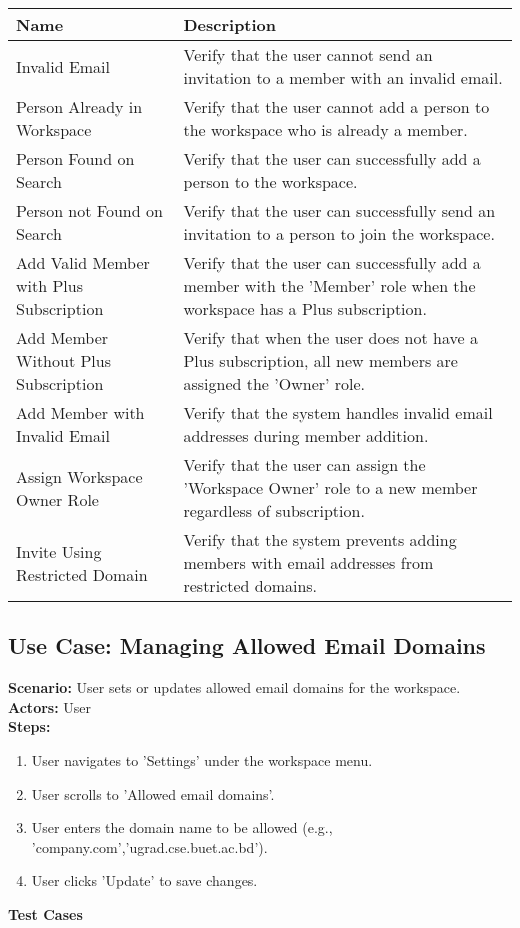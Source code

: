 \documentclass{article}
\begin{document}
            \begin{longtable}{|p{}|p{}|}
            \hline
            \textbf{Name} & \textbf{Description} \\
            \hline
            Invalid Email & Verify that the user cannot send an invitation to a member with an invalid email. \\
\hline
Person Already in Workspace & Verify that the user cannot add a person to the workspace who is already a member. \\
\hline
Person Found on Search & Verify that the user can successfully add a person to the workspace. \\
\hline
Person not Found on Search & Verify that the user can successfully send an invitation to a person to join the workspace. \\
\hline
Add Valid Member with Plus Subscription & Verify that the user can successfully add a member with the 'Member' role when the workspace has a Plus subscription. \\
\hline
Add Member Without Plus Subscription & Verify that when the user does not have a Plus subscription, all new members are assigned the 'Owner' role. \\
\hline
Add Member with Invalid Email & Verify that the system handles invalid email addresses during member addition. \\
\hline
Assign Workspace Owner Role & Verify that the user can assign the 'Workspace Owner' role to a new member regardless of subscription. \\
\hline
Invite Using Restricted Domain & Verify that the system prevents adding members with email addresses from restricted domains. \\
\hline
\end{longtable}\subsection{\textbf{Use Case: Managing Allowed Email Domains}}
\textbf{Scenario:} User sets or updates allowed email domains for the workspace.\\
\textbf{Actors:} User\\
\textbf{Steps:}
\begin{enumerate}
\item User navigates to 'Settings' under the workspace menu.
\item User scrolls to 'Allowed email domains'.
\item User enters the domain name to be allowed (e.g., 'company.com','ugrad.cse.buet.ac.bd').
\item User clicks 'Update' to save changes.
\end{enumerate}
\textbf{Test Cases}
\end{document}
